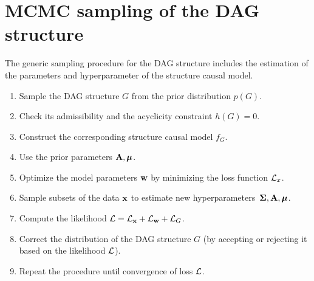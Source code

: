 \documentclass[12pt]{article}
\begin{document}
\section{MCMC sampling of the DAG structure}
The generic sampling procedure for the DAG structure includes the estimation of the
parameters and hyperparameter of the structure causal model.
\begin{enumerate}
    \item Sample the DAG structure $G$ from the prior distribution $p(G)$.
    \item Check its admissibility  and the acyclicity constraint $h(G) = 0$.
    \item Construct the corresponding structure causal model $f_G$.
    \item Use the prior parameters $\mathbf{A}, {\boldsymbol{\mu}}$.
    \item Optimize the model parameters $\mathbf{w}$ by minimizing the loss function $\mathcal{L}_x$.
    \item Sample subsets of the data $\mathbf{x}$ to estimate new hyperparameters~${\boldsymbol{\Sigma}}, \mathbf{A}, {\boldsymbol{\mu}}$.
    \item Compute the likelihood $\mathcal{L} =\mathcal{L}_{\mathbf{x}} + \mathcal{L}_{\mathbf{w}} + \mathcal{L}_G$.
    \item Correct the distribution of the DAG structure $G$ (by accepting or rejecting it based on the likelihood $\mathcal{L}$).
    \item Repeat the procedure until convergence of loss $\mathcal{L}$.
\end{enumerate}
\end{document}
